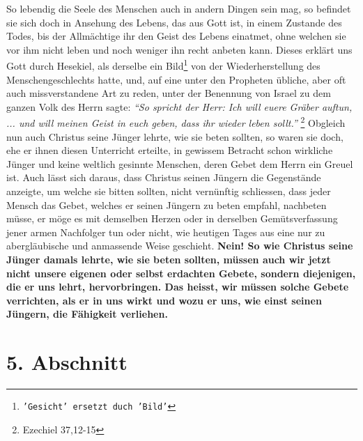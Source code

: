  So lebendig die Seele des Menschen auch in andern
Dingen sein mag, so befindet
sie sich doch in Ansehung des Lebens, das aus Gott ist, in einem Zustande des
Todes, bis der Allmächtige ihr den Geist des Lebens einatmet, ohne welchen sie
vor ihm nicht leben und noch weniger ihn recht anbeten kann. Dieses erklärt uns
Gott durch Hesekiel, als derselbe ein Bild\footnote{\texttt{'Gesicht' ersetzt
duch
'Bild'}} von der Wiederherstellung des
Menschengeschlechts hatte, und,
auf eine unter den Propheten  übliche, aber oft auch
missverstandene Art zu
reden, unter der Benennung von Israel  zu dem
ganzen Volk des Herrn sagte:
\textit{"`So spricht der Herr: Ich will euere Gräber auftun, ... und will meinen
Geist in
euch geben, dass ihr wieder leben sollt."'}
\footnote{Ezechiel 37,12-15} 
Obgleich nun auch Christus seine
Jünger lehrte, wie sie beten sollten, so waren sie doch, ehe er ihnen diesen
Unterricht erteilte, in gewissem Betracht schon wirkliche Jünger und keine
weltlich gesinnte Menschen, deren Gebet dem Herrn ein Greuel ist. Auch
lässt sich daraus, dass Christus seinen Jüngern die Gegenstände anzeigte, um
welche sie bitten sollten, nicht
vernünftig schliessen, dass jeder Mensch das Gebet, welches er seinen Jüngern zu
beten empfahl, nachbeten  müsse, er möge es mit
demselben Herzen oder in
derselben Gemütsverfassung jener armen Nachfolger tun oder nicht, wie heutigen
Tages aus eine nur zu abergläubische und anmassende Weise geschieht.
\label{ref:06_04_gebet} \textbf{Nein! So
wie Christus seine Jünger damals lehrte, wie sie beten sollten, müssen auch wir
jetzt nicht unsere eigenen oder selbst erdachten Gebete, sondern diejenigen, die
er uns
lehrt, hervorbringen. Das heisst, wir müssen solche Gebete verrichten, als er
in uns wirkt und wozu er uns, wie einst seinen Jüngern, die Fähigkeit
verliehen.}

\section{5. Abschnitt} \label{kap6_ab5}

